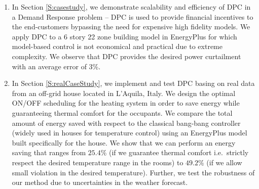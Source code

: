 {\begin{enumerate}
	\item In Section \ref{S:casestudy}, we demonstrate scalability and efficiency of DPC in a Demand Response problem -- DPC is used to provide financial incentives to the end-customers bypassing the need for expensive high fidelity models. We apply DPC to a 6 story 22 zone building model in EnergyPlus for which model-based control is not economical and practical due to extreme complexity. We observe that DPC provides the desired power curtailment with an average error of 3\%.
	\item In Section \ref{S:realCaseStudy}, we implement and test DPC basing on real data from an off-grid house located in L'Aquila, Italy. We design the optimal ON/OFF scheduling for the heating system in order to save energy while guaranteeing thermal comfort for the occupants. We compare the total amount of energy saved with respect to the classical bang-bang controller (widely used in houses for temperature control) using an EnergyPlus model built specifically for the house. We show that we can perform an energy saving that ranges from $25.4\%$ (if we guarantee thermal comfort i.e.~strictly respect the desired temperature range in the rooms) to $49.2\%$ (if we allow small violation in the desired temperature). Further, we test the robustness of our method due to uncertainties in the weather forecast.
\end{enumerate}
}


